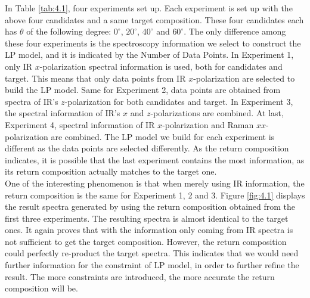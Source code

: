 In Table \ref{tab:4.1}, four experiments set up. Each experiment is set up with the above four candidates and a same target composition. These four candidates each has $\theta$ of the following degree: $0^{\circ}$, $20^{\circ}$, $40^{\circ}$ and $60^{\circ}$. The only difference among these four experiments is the spectroscopy information we select to construct the LP model, and it is indicated by the Number of Data Points. In Experiment 1, only IR $x$-polarization spectral information is used, both for candidates and target. This means that only data points from IR $x$-polarization are selected to build the LP model. Same for Experiment 2, data points are obtained from spectra of IR's $z$-polarization for both candidates and target. In Experiment 3, the spectral information of IR's $x$ and $z$-polarizations are combined. At last, Experiment 4, spectral information of IR $x$-polarization and Raman $xx$-polarization are combined. The LP model we build for each experiment is different as the data points are selected differently. As the return composition indicates, it is possible that the last experiment contains the most information, as its return composition actually matches to the target one. \\

One of the interesting phenomenon is that when merely using IR information, the return composition is the same for Experiment 1, 2 and 3. Figure \ref{fig:4.1} displays the result spectra generated by using the return composition obtained from the first three experiments. The resulting spectra is almost identical to the target ones. It again proves that with the information only coming from IR spectra is not sufficient to get the target composition.  However, the return composition could perfectly re-product the target spectra. This indicates that we would need further information for the constraint of LP model, in order to further refine the result. The more constraints are introduced, the more accurate the return composition will be. \\



